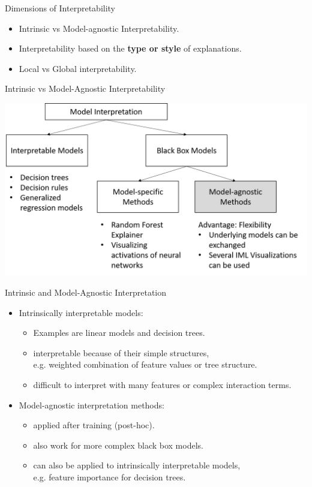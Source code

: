 \documentclass[11pt,compress,t,notes=noshow, xcolor=table]{beamer}
\begin{document}
\begin{vbframe}{Dimensions of Interpretability}
	\begin{itemize}
		\itemsep2em
		\item 
		Intrinsic vs Model-agnostic Interpretability.
		
		\item 
		Interpretability based on the \textbf{type or style} of explanations.
		
		\item 
		Local vs Global interpretability.
		
	\end{itemize}
\end{vbframe}


\begin{vbframe}{Intrinsic vs Model-Agnostic Interpretability}
	\begin{center}
		\includegraphics[width=\textwidth]{figure/overview}
	\end{center}
\end{vbframe}


\begin{vbframe}{Intrinsic and Model-Agnostic Interpretation}
	\begin{itemize}
		\item Intrinsically interpretable models:
		\begin{itemize}
			\item Examples are linear models and decision trees.
			\item interpretable because of their simple structures,\\ 
			e.g. weighted combination of feature values or tree structure. 
			\item difficult to interpret with many features or complex interaction terms.
		\end{itemize}
	\bigskip
	
		\item Model-agnostic interpretation methods:
		\begin{itemize}
			\item applied after training (post-hoc).
			\item also work for more complex black box models.
			\item can also be applied to intrinsically interpretable models,\\ 
			e.g. feature importance for decision trees. 
		\end{itemize}
	\end{itemize}
\end{vbframe}
\end{document}
